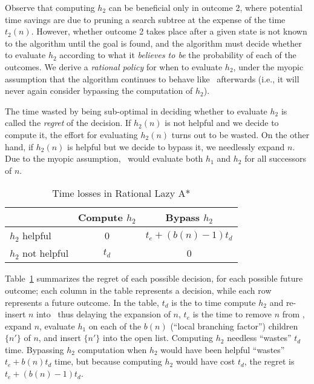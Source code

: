 Observe that computing $h_2$ can be beneficial only in outcome 2, where
potential time savings are due to pruning a search subtree at the expense of
the time $t_2(n)$. However, whether outcome 2 takes place after a given state
is not known to the algorithm until the goal is found, and the algorithm must
decide whether to evaluate $h_2$ according to what it \textit{believes to be}
the probability of each of the outcomes. We derive a \textit{rational policy}
for when to evaluate $h_2$, under the myopic assumption that the algorithm
continues to behave like \lazyastar~afterwards (i.e., it will never again
consider bypassing the computation of $h_2$).

The time wasted by being sub-optimal in deciding whether to evaluate $h_2$ is
called the {\em regret} of the decision. If $h_2(n)$ is not helpful and we decide to compute it, the effort for evaluating $h_2(n)$ turns out to be wasted. On the other hand, if $h_2(n)$ is helpful but we decide to bypass it, we needlessly expand $n$. Due to the myopic assumption, \rationallazyastar~would evaluate both $h_1$ and $h_2$ for all successors of
$n$.

\begin{table}[t]
\begin{small}
\begin{center}
\begin{tabular}{|l|c|c|}
\hline
               & Compute $h_2$ & Bypass $h_2$\\
\hline
$h_2$ helpful &   0            & $t_e+(b(n)-1)t_d$\\
\hline
$h_2$ not helpful & $t_d$      & 0 \\
\hline
\end{tabular}
\end{center}
\end{small}\vspace{-0.2cm}
\caption{Time losses in Rational Lazy A*}
\label{tbl:rational-lazy-a-time}
\end{table}

Table~\ref{tbl:rational-lazy-a-time}
summarizes the regret of each possible decision, for each possible future
outcome; each column in the table represents a decision, while each row
represents a future outcome.
In the table, $t_d$ is the to time compute $h_2$ and re-insert $n$ into
\OPEN~thus delaying the expansion of $n$, $t_e$ is the time to remove $n$ from \OPEN,
expand $n$, evaluate $h_1$ on each of the $b(n)$ (``local branching factor'')
children $\{n'\}$ of $n$, and insert $\{n'\}$ into the open list.
Computing $h_2$ needless ``wastes'' $t_d$ time.
Bypassing $h_2$ computation when $h_2$ would have been helpful ``wastes''
$t_e+b(n)t_d$ time, but because computing $h_2$ would have cost $t_d$, the
regret is $t_e+(b(n)-1)t_d$.



